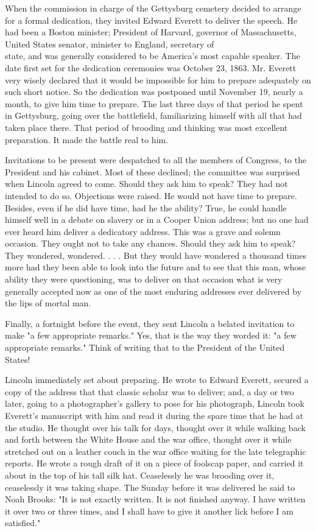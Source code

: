 \documentclass[10pt]{article}
\begin{document}
When the commission in charge of the Gettysburg cemetery decided to arrange for a formal dedication, they invited Edward Everett to deliver the speech. He had been a Boston minister; President of Harvard, governor of Massachusetts, United States senator, minister to England, secretary of\\
state, and was generally considered to be America's most capable speaker. The date first set for the dedication ceremonies was October 23, 1863. Mr. Everett very wisely declared that it would be impossible for him to prepare adequately on such short notice. So the dedication was postponed until November 19, nearly a month, to give him time to prepare. The last three days of that period he spent in Gettysburg, going over the battlefield, familiarizing himself with all that had taken place there. That period of brooding and thinking was most excellent preparation. It made the battle real to him.

Invitations to be present were despatched to all the members of Congress, to the President and his cabinet. Most of these declined; the committee was surprised when Lincoln agreed to come. Should they ask him to speak? They had not intended to do so. Objections were raised. He would not have time to prepare. Besides, even if he did have time, had he the ability? True, he could handle himself well in a debate on slavery or in a Cooper Union address; but no one had ever heard him deliver a dedicatory address. This was a grave and solemn occasion. They ought not to take any chances. Should they ask him to speak? They wondered, wondered. . . . But they would have wondered a thousand times more had they been able to look into the future and to see that this man, whose ability they were questioning, was to deliver on that occasion what is very generally accepted now as one of the most enduring addresses ever delivered by the lips of mortal man.

Finally, a fortnight before the event, they sent Lincoln a belated invitation to make "a few appropriate remarks." Yes, that is the way they worded it: "a few appropriate remarks." Think of writing that to the President of the United States!

Lincoln immediately set about preparing. He wrote to Edward Everett, secured a copy of the address that that classic scholar was to deliver; and, a day or two later, going to a photographer's gallery to pose for his photograph, Lincoln took Everett's manuscript with him and read it during the spare time that he had at the studio. He thought over his talk for days, thought over it while walking back and forth between the White House and the war office, thought over it while stretched out on a leather couch in the war office waiting for the late telegraphic reports. He wrote a rough draft of it on a piece of foolscap paper, and carried it about in the top of his tall silk hat. Ceaselessly he was brooding over it, ceaselessly it was taking shape. The Sunday before it was delivered he said to Noah Brooks: "It is not exactly written. It is not finished anyway. I have written it over two or three times, and I shall have to give it another lick before I am satisfied."
\end{document}
